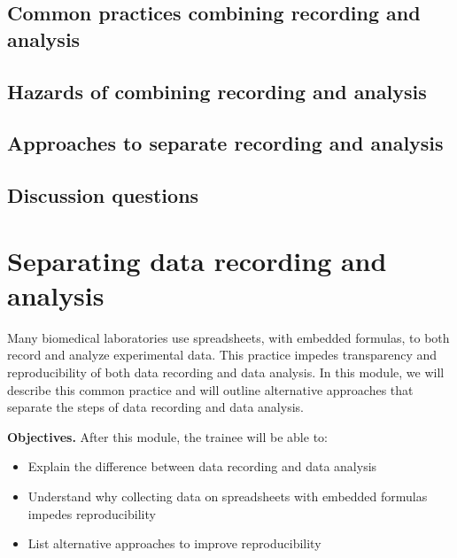 \documentclass[]{tufte-book}
\providecommand{\tightlist}{%
  \setlength{\itemsep}{0pt}\setlength{\parskip}{0pt}}
\begin{document}
\hypertarget{common-practices-combining-recording-and-analysis-1}{%
\subsection{Common practices combining recording and analysis}\label{common-practices-combining-recording-and-analysis-1}}

\hypertarget{hazards-of-combining-recording-and-analysis-1}{%
\subsection{Hazards of combining recording and analysis}\label{hazards-of-combining-recording-and-analysis-1}}

\hypertarget{approaches-to-separate-recording-and-analysis-1}{%
\subsection{Approaches to separate recording and analysis}\label{approaches-to-separate-recording-and-analysis-1}}

\hypertarget{discussion-questions-1}{%
\subsection{Discussion questions}\label{discussion-questions-1}}

\hypertarget{separating-data-recording-and-analysis-2}{%
\section{Separating data recording and analysis}\label{separating-data-recording-and-analysis-2}}

Many biomedical laboratories use spreadsheets, with embedded formulas, to both
record and analyze experimental data. This practice impedes transparency and
reproducibility of both data recording and data analysis. In this module, we
will describe this common practice and will outline alternative approaches that
separate the steps of data recording and data analysis.

\textbf{Objectives.} After this module, the trainee will be able to:

\begin{itemize}
\tightlist
\item
  Explain the difference between data recording and data analysis
\item
  Understand why collecting data on spreadsheets with embedded formulas impedes
  reproducibility
\item
  List alternative approaches to improve reproducibility
\end{itemize}
\end{document}
